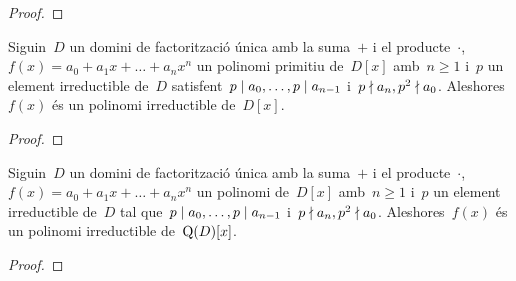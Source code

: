 \documentclass[../estructures-algebraiques.tex]{subfiles}
\begin{document}
    \begin{proof}
    \end{proof}
    \begin{theorem}
        \label{thm:Criteri-dEisenstein}
        Siguin~\(D\) un domini de factorització única amb la suma~\(+\) i el producte~\(\cdot\),~\(f(x)=a_{0}+a_{1}x+\dots+a_{n}x^{n}\) un polinomi primitiu de~\(D[x]\) amb~\(n\geq1\) i~\(p\) un element irreductible de~\(D\) satisfent~\(p\mathrel{|} a_{0},\dots,p\mathrel{|} a_{n-1}\) i~\(p\mathrel{\nmid} a_{n},p^{2}\mathrel{\nmid} a_{0}\).
        Aleshores~\(f(x)\) és un polinomi irreductible de~\(D[x]\).
    \end{theorem}
    \begin{proof}
    \end{proof}
    \begin{corollary}
        Siguin~\(D\) un domini de factorització única amb la suma~\(+\) i el producte~\(\cdot\),~\(f(x)=a_{0}+a_{1}x+\dots+a_{n}x^{n}\) un polinomi de~\(D[x]\) amb~\(n\geq1\) i~\(p\) un element irreductible de~\(D\) tal que~\(p\mathrel{|} a_{0},\dots,p\mathrel{|} a_{n-1}\) i~\(p\mathrel{\nmid} a_{n},p^{2}\mathrel{\nmid} a_{0}\).
        Aleshores~\(f(x)\) és un polinomi irreductible de~\(\operatorname{Q}(D)[x]\).
    \end{corollary}
    \begin{proof}
    \end{proof}
\end{document}
